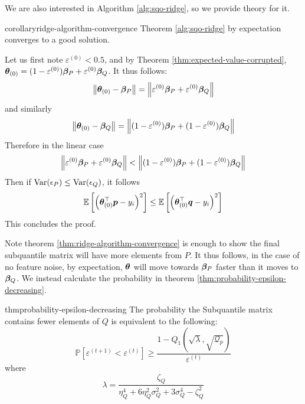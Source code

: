 \documentclass{article} %
\newenvironment{proofsketch}{%
	\renewcommand{\proofname}{Proof Sketch}\proof}{\endproof}
\newcommand{\norm}[1]{\left\lVert#1\right\rVert}
\begin{document}
	We are also interested in Algorithm \ref{alg:sqo-ridge}, so we provide theory for it.
	\begin{restatable}{corollary}{ridge-algorithm-convergence}
		\label{thm:ridge-algorithm-convergence}
		Theorem \ref{alg:sqo-ridge} by expectation converges to a good solution. 
	\end{restatable}
	\begin{proofsketch}
		Let us first note $\varepsilon^{(0)} < 0.5$, and by Theorem \ref{thm:expected-value-corrupted}, ${\bm{\theta}}_{(0)} = (1-\varepsilon^{(0)}){\bm{\beta}}_P + \varepsilon^{(0)}{\bm{\beta}}_Q$. It thus follows:
		\begin{equation}
			\norm{\vtheta_{(0)} - \vbeta_P} = \norm{\varepsilon^{(0)}\vbeta_P + \varepsilon^{(0)}\vbeta_Q}
		\end{equation}
		and similarly 
		\begin{equation}
			\norm{\vtheta_{(0)} - \vbeta_Q} = \norm{(1 - \varepsilon^{(0)})\vbeta_P + (1 - \varepsilon^{(0)}) \vbeta_Q}
		\end{equation}
		Therefore in the linear case 
		\begin{equation}\label{eqn:theta-0-closer-to-p}
			\norm{\varepsilon^{(0)}\vbeta_P + \varepsilon^{(0)}\vbeta_Q} < \norm{(1 - \varepsilon^{(0)})\vbeta_P + (1 - \varepsilon^{(0)}) \vbeta_Q}
		\end{equation}
		Then if $\mathrm{Var}(\epsilon_P) \leq \mathrm{Var}(\epsilon_Q)$, it follows 
		\begin{equation*}
			\mathbb{E}\left[\left({\bm{\theta}}_{(0)}^\top {\bm{p}} - y_i\right)^2\right] \leq \mathbb{E}\left[\left({\bm{\theta}}_{(0)}^\top {\bm{q}} - y_i\right)^2\right]
		\end{equation*}	
		This concludes the proof.
	\end{proofsketch}
	
	Note theorem \ref{thm:ridge-algorithm-convergence} is enough to show the final subquantile matrix will have more elements from $P$. It thus follows, in the case of no feature noise, by expectation, ${\bm{\theta}}$ will move towards ${\bm{\beta}}_P$ faster than it moves to ${\bm{\beta}}_Q$. We instead calculate the probability in theorem \ref{thm:probability-epsilon-decreasing}. 

	\begin{restatable}{thm}{probability-epsilon-decreasing}
		\label{thm:probability-epsilon-decreasing}
		The probability the Subquantile matrix contains fewer elements of $Q$ is equivalent to the following:
		\begin{equation}
			\mathbb{P}\left[\varepsilon^{(t+1)} < \varepsilon^{(t)}\right] \geq \frac{1 - Q_{1}\left(\sqrt{\lambda},\sqrt{\mathcal{Q}_p}\right)}{\varepsilon^{(t)}}
		\end{equation} where \begin{equation*} \lambda = \frac{\zeta_Q}{\eta_Q^4 + 6 \eta_Q^2 \sigma_Q^2 + 3\sigma_Q^4 - \zeta_Q^2}\end{equation*}
	\end{restatable}
	
\end{document}
